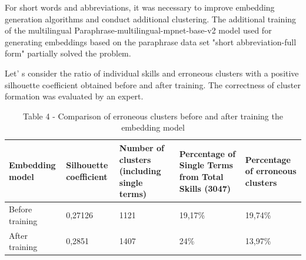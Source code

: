 \begin{multicols}{2}
For short words and abbreviations, it was necessary to improve embedding
generation algorithms and conduct additional clustering. The additional
training of the multilingual Paraphrase-multilingual-mpnet-base-v2 model
used for generating embeddings based on the paraphrase data set "short
abbreviation-full form" partially solved the problem.

Let' s consider the ratio of individual skills and
erroneous clusters with a positive silhouette coefficient obtained
before and after training. The correctness of cluster formation was
evaluated by an expert.
\end{multicols}

\begin{table}[H]
\caption*{Table 4 - Comparison of erroneous clusters before and after
training the embedding model}
\centering
\begin{tabular}{|p{}|p{}|p{}|p{}|p{}|}
\hline
\textbf{Embedding model} &
  \textbf{Silhouette coefficient} &
  \textbf{Number of clusters (including single terms)} &
  \textbf{Percentage of Single Terms from Total Skills (3047)} &
  \textbf{Percentage of erroneous clusters} \\ \hline
Before training &
  0,27126 &
  1121 &
  19,17\% &
  19,74\% \\ \hline
After training &
  0,2851 &
  1407 &
  24\% &
  13,97\% \\ \hline
\end{tabular}%
\end{table}

